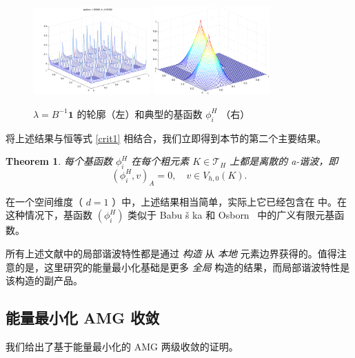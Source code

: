 \documentclass[12pt]{acta_2011xz}
\newtheorem{theorem}{Theorem}[section]
\begin{document}
   \begin{figure}[!htb]
\centering
\includegraphics*[width=0.4\textwidth]{figures/tinv}\hfill
\includegraphics*[width=0.4\textwidth]{figures/basis7-14}
    \caption{   $\lambda=B^{-1} \boldsymbol{1}$    的轮廓（左）和典型的基函数    $\phi_i^H$   （右）  }
\label{fig:lambda}
\end{figure}    将上述结果与恒等式    \eqref{crit1}    相结合，我们立即得到本节的第二个主要结果。
   \begin{theorem}   \label{thm:harmonic}    每个基函数    $\phi_i^H$    在每个粗元素    $K\in {\mathcal T}_H$    上都是离散的 a-谐波，即
   \begin{equation}\label{harmonic}
(\phi_i^H,v)_A=0,\quad v\in V_{h,0}(K).   
\end{equation}     \end{theorem}    在一个空间维度（   $d=1$   ）中，上述结果相当简单，实际上它已经包含在    \cite{Wan.W;Chan.T;Smith.B.1999a}    中。在这种情况下，基函数    $(\phi_i^H)$    类似于 Babu    \v{s}    ka 和 Osborn~    \cite{babuvska1983generalized}    中的广义有限元基函数。  

所有上述文献中的局部谐波特性都是通过  {    \it    构造   }  从  {    \it    本地   }  元素边界获得的。值得注意的是，这里研究的能量最小化基础是更多  {    \it    全局   }  构造的结果，而局部谐波特性是该构造的副产品。  

   \subsection{能量最小化 AMG 收敛  }    我们给出了基于能量最小化的 AMG 两级收敛的证明。  
\end{document}
